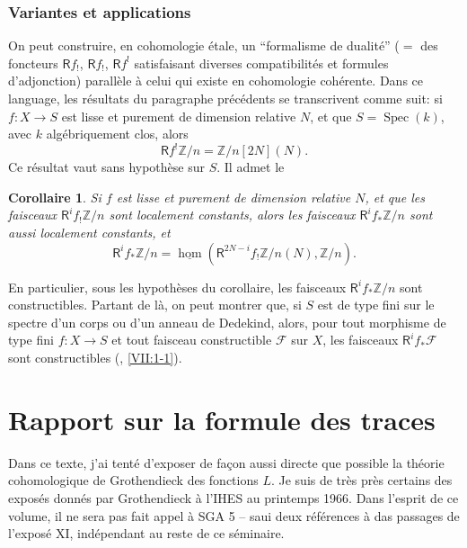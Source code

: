 \documentclass{book}
\DeclareMathOperator{\spec}{Spec}
\newcommand{\cF}{\mathcal{F}}
\newcommand{\dZ}{\mathbb{Z}}
\newcommand{\const}[1]{\underline{#1}}
\newcommand{\R}{\mathsf{R}}
\newtheorem{corollary}[subsubsection]{Corollaire}
\begin{document}
\subsection{Variantes et applications}\label{I:6-4}

On peut construire, en cohomologie étale, un ``formalisme de dualité'' 
($=$ des foncteurs $\R f_!$, $\R f_!$, $\R f^!$ satisfaisant diverses 
compatibilités et formules d'adjonction) parallèle à celui qui existe en 
cohomologie cohérente. Dans ce language, les résultats du paragraphe 
précédents se transcrivent comme suit: si $f:X\to S$ est lisse et purement 
de dimension relative $N$, et que $S=\spec(k)$, avec $k$ algébriquement clos, 
alors 
\[
  \R f^! \dZ/n = \dZ/n [2N](N) \text{.}
\]
Ce résultat vaut sans hypothèse sur $S$. Il admet le 





\begin{corollary}\label{I:6-4-1}
Si $f$ est lisse et purement de dimension relative $N$, et que les faisceaux 
$\R^i f_! \dZ/n$ sont localement constants, alors les faisceaux 
$\R^i f_* \dZ/n$ sont aussi localement constants, et 
\[
  \R^i f_* \dZ/n = \const\hom\left(\R^{2 N-i} f_! \dZ/n(N),\dZ/n\right)\text{.}
\]
\end{corollary}

En particulier, sous les hypothèses du corollaire, les faisceaux 
$\R^i f_* \dZ/n$ sont constructibles. Partant de là, on peut montrer que, si 
$S$ est de type fini sur le spectre d'un corps ou d'un anneau de Dedekind, 
alors, pour tout morphisme de type fini $f:X\to S$ et tout faisceau 
constructible $\cF$ sur $X$, les faisceaux $\R^i f_* \cF$ sont constructibles 
(, \ref{VII:1-1}). 




















\chapter{Rapport sur la formule des traces}\label{II}

Dans ce texte, j'ai tenté d'exposer de façon aussi directe que possible la 
théorie cohomologique de Grothendieck des fonctions $L$. Je suis de très près 
certains des exposés donnés par Grothendieck à l'IHES au printemps 1966. Dans 
l'esprit de ce volume, il ne sera pas fait appel à SGA 5 -- saui deux 
références à das passages de l'exposé XI, indépendant au reste de ce 
séminaire. 
\end{document}
